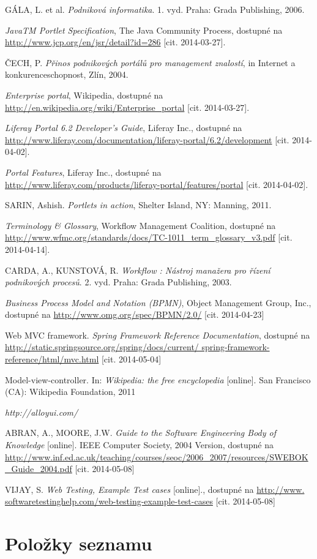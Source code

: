 \documentclass{fithesis}
\begin{document}
\begin{thebibliography}{0}


GÁLA, L. et al. \textit{Podniková informatika}. 1. vyd. Praha: Grada Publishing, 2006. 

\textit{JavaTM Portlet Specification}, The Java Community Process, dostupné na \url{http://www.jcp.org/en/jsr/detail?id=286} [cit. 2014-03-27].

ČECH, P. \textit {Přinos podnikových portálů pro management znalostí}, in Internet a konkurenceschopnost, Zlín, 2004.

\textit{Enterprise portal}, Wikipedia, dostupné na \url{http://en.wikipedia.org/wiki/Enterprise_portal} [cit. 2014-03-27].

\textit{Liferay Portal 6.2 Developer's Guide}, Liferay Inc., dostupné na \url{http://www.liferay.com/documentation/liferay-portal/6.2/development} [cit. 2014-04-02].

\textit{Portal Features}, Liferay Inc., dostupné na \url{http://www.liferay.com/products/liferay-portal/features/portal} [cit. 2014-04-02].

SARIN, Ashish. \textit{Portlets in action}, Shelter Island, NY: Manning, 2011.

\textit{Terminology \& Glossary}, Workflow Management Coalition, dostupné na \url{http://www.wfmc.org/standards/docs/TC-1011_term_glossary_v3.pdf} [cit. 2014-04-14].

CARDA, A., KUNSTOVÁ, R. \textit {Workflow : Nástroj manažera pro řízení podnikových procesů}. 2. vyd. Praha: Grada Publishing, 2003.

\textit{Business Process Model and Notation (BPMN)}, Object Management Group, Inc., dostupné na \url{http://www.omg.org/spec/BPMN/2.0/} [cit. 2014-04-23]

Web MVC framework. \textit{Spring Framework Reference Documentation}, dostupné na \url{http://static.springsource.org/spring/docs/current/
spring-framework-reference/html/mvc.html} [cit. 2014-05-04]

Model-view-controller. In: \textit{Wikipedia: the free encyclopedia} [online]. San Francisco (CA): Wikipedia Foundation, 2011

\textit{http://alloyui.com/}

ABRAN, A., MOORE, J.W. \textit{Guide to the Software Engineering Body of Knowledge} [online]. IEEE Computer Society, 2004 Version, dostupné na \url{http://www.inf.ed.ac.uk/teaching/courses/seoc/2006_2007/resources/SWEBOK_Guide_2004.pdf} [cit. 2014-05-08]

VIJAY, S. \textit{Web Testing, Example Test cases} [online]., dostupné na \url{http://www.
softwaretestinghelp.com/web-testing-example-test-cases} [cit. 2014-05-08]

\end{thebibliography}


\newpage
\appendix
\chapter{Položky seznamu}
\end{document}
